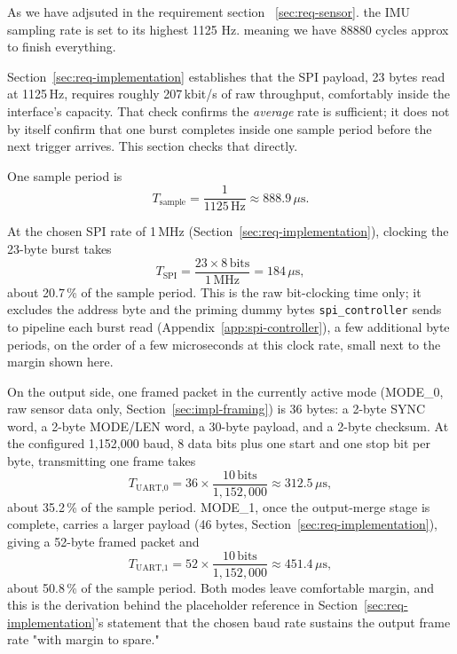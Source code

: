 \documentclass[12pt,a4paper]{article}
\begin{document}
{As we have adjsuted in the requirement section ~\ref{sec:req-sensor}. the IMU sampling rate is set to its highest 1125 Hz. meaning we have 88880 cycles approx to finish everything.

Section~\ref{sec:req-implementation} establishes that the SPI payload,
23 bytes read at 1125\,Hz, requires roughly 207\,kbit/s of raw
throughput, comfortably inside the interface's capacity. That check
confirms the \emph{average} rate is sufficient; it does not by itself
confirm that one burst completes inside one sample period before the
next trigger arrives. This section checks that directly.

One sample period is
\begin{equation}
  T_{\text{sample}} = \frac{1}{1125\,\text{Hz}} \approx 888.9\,\mu\text{s}.
  \label{eq:impl-tsample}
\end{equation}

At the chosen SPI rate of 1\,MHz (Section~\ref{sec:req-implementation}),
clocking the 23-byte burst takes
\begin{equation}
  T_{\text{SPI}} = \frac{23 \times 8\,\text{bits}}{1\,\text{MHz}} = 184\,\mu\text{s},
  \label{eq:impl-tspi}
\end{equation}
about 20.7\,\% of the sample period. This is the raw bit-clocking time
only; it excludes the address byte and the priming dummy bytes
\texttt{spi\_controller} sends to pipeline each burst read
(Appendix~\ref{app:spi-controller}), a few additional byte periods, on
the order of a few microseconds at this clock rate, small next to the
margin shown here.

On the output side, one framed packet in the currently active mode
(MODE\_0, raw sensor data only, Section~\ref{sec:impl-framing}) is 36
bytes: a 2-byte SYNC word, a 2-byte MODE/LEN word, a 30-byte payload,
and a 2-byte checksum. At the configured 1{,}152{,}000 baud, 8 data bits
plus one start and one stop bit per byte, transmitting one frame takes
\begin{equation}
  T_{\text{UART,0}} = 36 \times \frac{10\,\text{bits}}{1{,}152{,}000} \approx 312.5\,\mu\text{s},
  \label{eq:impl-tuart0}
\end{equation}
about 35.2\,\% of the sample period. MODE\_1, once the output-merge
stage is complete, carries a larger payload (46 bytes,
Section~\ref{sec:req-implementation}), giving a 52-byte framed packet
and
\begin{equation}
  T_{\text{UART,1}} = 52 \times \frac{10\,\text{bits}}{1{,}152{,}000} \approx 451.4\,\mu\text{s},
  \label{eq:impl-tuart1}
\end{equation}
about 50.8\,\% of the sample period. Both modes leave comfortable
margin, and this is the derivation behind the placeholder reference in
Section~\ref{sec:req-implementation}'s statement that the chosen baud
rate sustains the output frame rate "with margin to spare."

}
\end{document}
